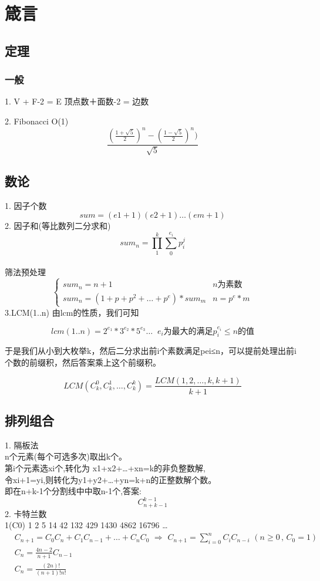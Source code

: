 \documentclass{article}
\begin{document}



\section{箴言}

\subsection{定理}
\subsubsection{一般}
1. V + F-2 = E 顶点数＋面数-2 = 边数

2. Fibonacci O(1)$$\frac{ ( \frac{1+\sqrt{5}}{2} )^n - (\frac{1-\sqrt{5}}{2})^n ) }{ \sqrt{5} }$$

\newpage
\subsection{数论}
1. 因子个数
$$sum=(e1+1)(e2+1)…(em+1)$$
2. 因子和(等比数列二分求和)
$$sum_n=\prod_1^k \sum_0^{e_i}p_i^j$$\\
筛法预处理
$$\begin{cases}
sum_n = n+1  &n为素数    \\
sum_n = (1 + p + p^2 + … + p^e)*sum_m  & n = p^e*m
\end{cases}
$$
3.LCM(1..n)
由lcm的性质，我们可知

$$lcm(1..n) = 2^{e_1} * 3^{e_2} * 5^{e_3} … \;\; e_i \text{为最大的满足} p_i^{e_i} \le n \text{的值}$$

于是我们从小到大枚举k，然后二分求出前i个素数满足pei≤n，可以提前处理出前i个数的前缀积，然后答案乘上这个前缀积。

$$LCM(C_k^0,C_k^1,…,C_k^k) = \frac{LCM(1,2,…,k,k+1)}{k+1}$$
\newpage
\subsection{排列组合}
1. 隔板法	\\
n个元素(每个可选多次)取出k个。	\\
第i个元素选xi个,转化为 x1+x2+…+xn=k的非负整数解,		\\
令xi+1=yi,则转化为y1+y2+…+yn=k+n的正整数解个数。		\\
即在n+k-1个分割线中中取n-1个,答案:
$$C_{n+k-1}^{k-1}$$
2. 卡特兰数	\\
1(C0) 1 2 5 14 42 132 429 1430 4862 16796 …	\\
$$\begin{aligned}
&C_{n+1}=C_0C_n+C_1C_{n-1}+…+C_nC_0 \,\, \Rightarrow  \,\, C_{n+1}= \sum_{i=0}^n C_iC_{n-i} \,\, (n \ge 0 \, , \,C_0=1)	\\
&C_{n}=\frac{4n-2}{n+1}C_{n-1}	\\
&C_n=\frac{(2n)!}{(n+1)!n!}
\end{aligned}
$$
\newpage
\end{document}
